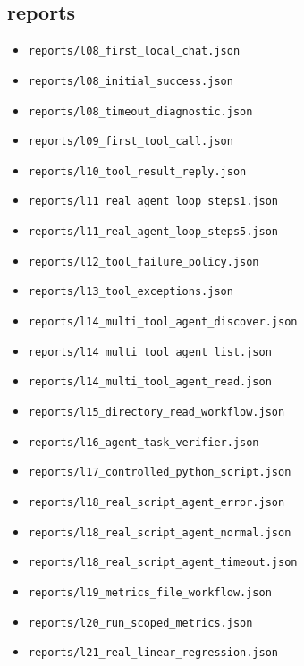 \documentclass[UTF8,zihao=-4,fontset=fandol]{ctexart}
\begin{document}
\subsection{reports}
\begin{itemize}
\item \nolinkurl{reports/l08_first_local_chat.json}
\item \nolinkurl{reports/l08_initial_success.json}
\item \nolinkurl{reports/l08_timeout_diagnostic.json}
\item \nolinkurl{reports/l09_first_tool_call.json}
\item \nolinkurl{reports/l10_tool_result_reply.json}
\item \nolinkurl{reports/l11_real_agent_loop_steps1.json}
\item \nolinkurl{reports/l11_real_agent_loop_steps5.json}
\item \nolinkurl{reports/l12_tool_failure_policy.json}
\item \nolinkurl{reports/l13_tool_exceptions.json}
\item \nolinkurl{reports/l14_multi_tool_agent_discover.json}
\item \nolinkurl{reports/l14_multi_tool_agent_list.json}
\item \nolinkurl{reports/l14_multi_tool_agent_read.json}
\item \nolinkurl{reports/l15_directory_read_workflow.json}
\item \nolinkurl{reports/l16_agent_task_verifier.json}
\item \nolinkurl{reports/l17_controlled_python_script.json}
\item \nolinkurl{reports/l18_real_script_agent_error.json}
\item \nolinkurl{reports/l18_real_script_agent_normal.json}
\item \nolinkurl{reports/l18_real_script_agent_timeout.json}
\item \nolinkurl{reports/l19_metrics_file_workflow.json}
\item \nolinkurl{reports/l20_run_scoped_metrics.json}
\item \nolinkurl{reports/l21_real_linear_regression.json}
\end{itemize}
\end{document}
